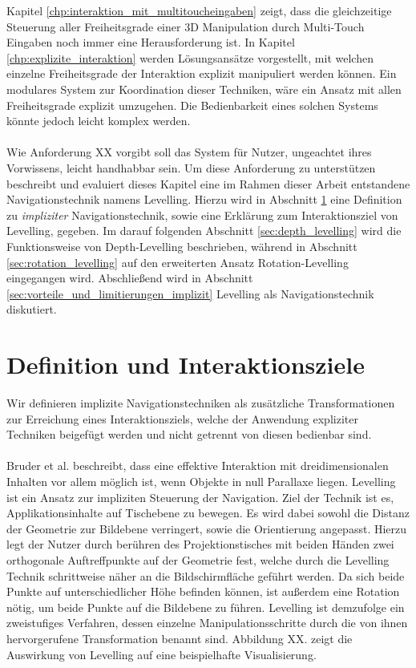 Kapitel \ref{chp:interaktion_mit_multitoucheingaben} zeigt, dass die gleichzeitige Steuerung aller Freiheitsgrade einer 3D Manipulation durch Multi-Touch Eingaben noch immer eine Herausforderung ist. In Kapitel \ref{chp:explizite_interaktion} werden Lösungsansätze vorgestellt, mit welchen einzelne Freiheitsgrade der Interaktion explizit manipuliert werden können. Ein modulares System zur Koordination dieser Techniken, wäre ein Ansatz mit allen Freiheitsgrade explizit umzugehen. Die Bedienbarkeit eines solchen Systems könnte jedoch leicht komplex werden.
\\\\
Wie Anforderung XX vorgibt soll das System für Nutzer, ungeachtet ihres Vorwissens, leicht handhabbar sein. Um diese Anforderung zu unterstützen beschreibt und evaluiert dieses Kapitel eine im Rahmen dieser Arbeit entstandene Navigationstechnik namens Levelling. Hierzu wird in Abschnitt \ref{sec:definition_levelling} eine Definition zu \emph{impliziter} Navigationstechnik, sowie eine Erklärung zum Interaktionsziel von Levelling, gegeben. Im darauf folgenden Abschnitt \ref{sec:depth_levelling} wird die Funktionsweise von Depth-Levelling beschrieben, während in Abschnitt \ref{sec:rotation_levelling} auf den erweiterten Ansatz Rotation-Levelling eingegangen wird. Abschließend wird in Abschnitt \ref{sec:vorteile_und_limitierungen_implizit} Levelling als Navigationstechnik diskutiert.


\section{Definition und Interaktionsziele}
\label{sec:definition_levelling}

Wir definieren implizite Navigationstechniken als zusätzliche Transformationen zur Erreichung eines Interaktionsziels, welche der Anwendung expliziter Techniken beigefügt werden und nicht getrennt von diesen bedienbar sind. 
\\\\
Bruder et al. \cite{bruder:2013} beschreibt, dass eine effektive Interaktion mit dreidimensionalen Inhalten vor allem möglich ist, wenn Objekte in null Parallaxe liegen. Levelling ist ein Ansatz zur impliziten Steuerung der Navigation. Ziel der Technik ist es, Applikationsinhalte auf Tischebene zu bewegen. Es wird dabei sowohl die Distanz der Geometrie zur Bildebene verringert, sowie die Orientierung angepasst. Hierzu legt der Nutzer durch berühren des Projektionstisches mit beiden Händen zwei orthogonale Auftreffpunkte auf der Geometrie fest, welche durch die Levelling Technik schrittweise näher an die Bildschirmfläche geführt werden. Da sich beide Punkte auf unterschiedlicher Höhe befinden können, ist außerdem eine Rotation nötig, um beide Punkte auf die Bildebene zu führen. Levelling ist demzufolge ein zweistufiges Verfahren, dessen einzelne Manipulationsschritte durch die von ihnen hervorgerufene Transformation benannt sind. Abbildung XX. zeigt die Auswirkung von Levelling auf eine beispielhafte Visualisierung.


